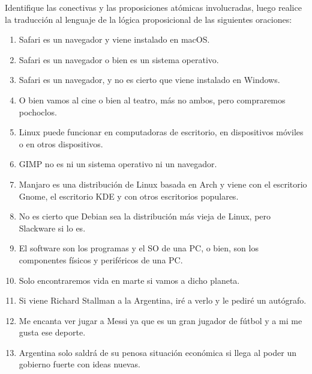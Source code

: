 \begin{exercise}
    Identifique las conectivas y las proposiciones atómicas involucradas, luego
    realice la traducción al lenguaje de la lógica proposicional de las
    siguientes oraciones:

    \begin{enumerate}[a]
      \item Safari es un navegador y viene instalado en macOS.
      \item Safari es un navegador o bien es un sistema operativo.
      \item Safari es un navegador, y no es cierto que viene instalado en
      Windows.
      \item O bien vamos al cine o bien al teatro, más no ambos, pero
      compraremos pochoclos.
      \item Linux puede funcionar en computadoras de escritorio, en dispositivos
      móviles o en otros dispositivos.
      \item GIMP no es ni un sistema operativo ni un navegador.
      \item Manjaro es una distribución de Linux basada en Arch y viene con el
          escritorio Gnome, el escritorio KDE y con otros escritorios populares.
      \item No es cierto que Debian sea la distribución más vieja de Linux, pero
        Slackware si lo es.
      \item El software son los programas y el SO de una PC, o bien, son los
      componentes físicos y periféricos de una PC.
      \item Solo encontraremos vida en marte si vamos a dicho planeta.
      \item Si viene Richard Stallman a la Argentina, iré a verlo y le pediré un
      autógrafo.
      \item Me encanta ver jugar a Messi ya que es un gran jugador de fútbol y a
      mi me gusta ese deporte.
      \item Argentina solo saldrá de su penosa situación económica si llega al
      poder un gobierno fuerte con ideas nuevas.
    \end{enumerate}
\end{exercise}

